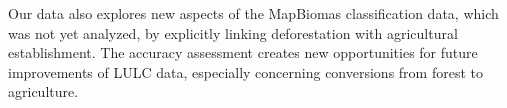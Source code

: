\documentclass[essd, manuscript]{copernicus}
\begin{document}
Our data also explores new aspects of the MapBiomas classification data, which was not yet analyzed, by explicitly linking deforestation with agricultural establishment.
The accuracy assessment creates new opportunities for future improvements of LULC data, especially concerning conversions from forest to agriculture.


















\end{document}
